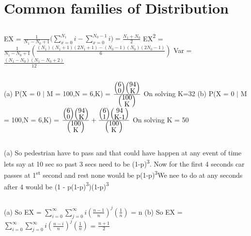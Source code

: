 \documentclass{report}
\begin{document}
	\setcounter{chapter}{2}
	\chapter{Common families of Distribution}
		
\section{}
EX = {$\frac{1}{N_{1} - N_{0} + 1}($$\sum_{x=0}^{N_{1}}i - \sum_{x=0}^{N_{0} - 1}i) = \frac{N_{1} + N_{0}}{2}$}
\newline
EX{\textsuperscript{2}} = {$\frac{1}{N_{1} - N_{0} + 1}(\frac{(N_{1})(N_{1} + 1)(2N_{1} + 1) - (N_{0} - 1)(N_{0})(2N_{0} - 1)}{6})$}
\newline
Var = {$\frac{(N_{1} - N_{0})(N_1 - N_0 + 2)}{12}$}
\newline

\section{}
(a) P(X = 0 {$\vert$} M = 100,N = 6,K) = $\frac{\left(\stackanchor{6}{0}\right) \left(\stackanchor{94}{K}\right)}{\left(\stackanchor{100}{K}\right)}$
On solving K=32
{\newline}
(b) P(X = 0 {$\vert$} M = 100,N = 6,K) = $\frac{\left(\stackanchor{6}{0}\right) \left(\stackanchor{94}{K}\right)}{\left(\stackanchor{100}{K}\right)} + \frac{\left(\stackanchor{6}{1}\right) \left(\stackanchor{94}{K-1}\right)}{\left(\stackanchor{100}{K}\right)}$
{\newline}
On solving K = 50
{\newline}

\section{}
(a) So pedestrian have to pass and that could have happen at any event of time lets say at 10 sec so past 3 secs need to be (1-p){\textsuperscript{3}}.
Now for the first 4 seconds car passes at 1{\textsuperscript{st}} second and rest none would be p(1-p){\textsuperscript{3}}We nee to do at any seconds after 4 would be (1 - p(1-p){\textsuperscript{3}})(1-p){\textsuperscript{3}}
{\newline}

\section{}
(a) So EX = {$\sum_{i=0}^{\infty}\sum_{j=0}^{\infty}i\left(\frac{n-1}{n}\right)^j\left(\frac{1}{n}\right)$} = n
\newline
(b) So EX = 
{$\sum_{i=0}^{\infty}\sum_{j=0}^{\infty}i\left(\frac{n-i}{n}\right)^j\left(\frac{1}{n}\right)$} = $\frac{n+1}{2}$
{\newline}
\end{document}
